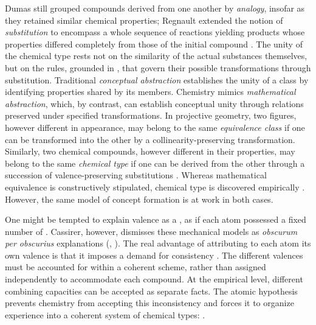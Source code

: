 \documentclass[submitted,12pt]{article}
\begin{document}
Dumas still grouped compounds derived from one another by \emph{analogy}, insofar as they retained similar chemical properties; Regnault extended the notion of \emph{substitution} to encompass a whole sequence of reactions yielding products whose properties differed completely from those of the initial compound . The unity of the chemical type rests not on the similarity of the actual substances themselves, but on the rules, grounded in , that govern their possible transformations through substitution. Traditional \emph{conceptual abstraction} establishes the unity of a class by identifying properties shared by its members. Chemistry mimics \emph{mathematical abstraction}, which, by contrast, can establish conceptual unity through relations preserved under specified transformations. In projective geometry, two figures, however different in appearance, may belong to the same \emph{equivalence class} if one can be transformed into the other by a collinearity-preserving transformation. Similarly, two chemical compounds, however different in their properties, may belong to the same \emph{chemical type} if one can be derived from the other through a succession of valence-preserving substitutions . Whereas mathematical equivalence is constructively stipulated, chemical type is discovered empirically . However, the same model of concept formation is at work in both cases.

One might be tempted to explain valence as a , as if each atom possessed a fixed number of  . Cassirer, however, dismisses these mechanical models as \textit{obscurum per obscurius} explanations (, \cite[see][175]{Wurtz1879}). The real advantage of attributing to each atom its own valence is that it imposes a demand for consistency . The different valences must be accounted for within a coherent scheme, rather than assigned independently to accommodate each compound. At the empirical level, different combining capacities can be accepted as separate facts. The atomic hypothesis prevents chemistry from accepting this inconsistency and forces it to organize experience into a coherent system of chemical types:  .
\end{document}
